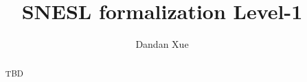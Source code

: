 \documentclass[a4paper]{article}
\title{SNESL formalization Level-1}
\author{Dandan Xue}
\numberwithin{equation}{section}
\numberwithin{figure}{section}
\begin{document}
\large
\maketitle

\begin{abstract}
	TBD
\end{abstract}


\tableofcontents
\newpage




%
%
%

\newpage


\end{document}
